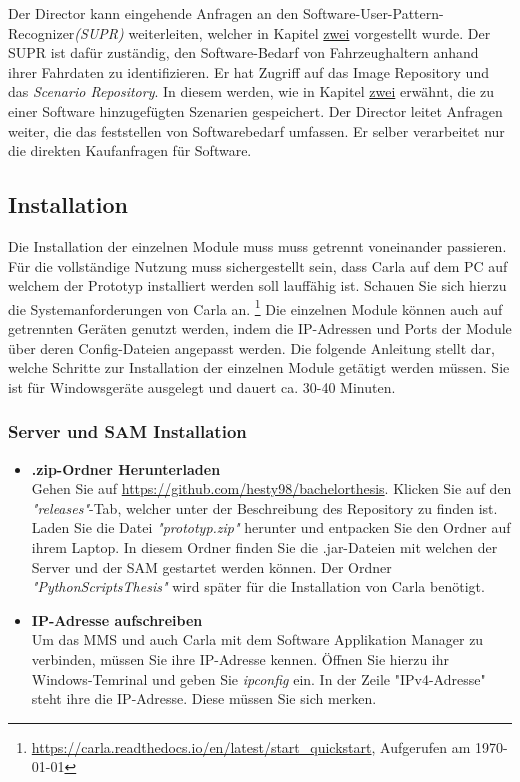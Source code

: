 Der Director kann eingehende Anfragen an den Software-User-Pattern-Recognizer\textit{(SUPR)} weiterleiten, welcher in Kapitel \hyperref[fs]{zwei} vorgestellt wurde. Der SUPR ist dafür zuständig, den Software-Bedarf von Fahrzeughaltern anhand ihrer Fahrdaten zu identifizieren. Er hat Zugriff auf das Image Repository und das \textit{Scenario Repository}. In diesem werden, wie in Kapitel \hyperref[konzept]{zwei} erwähnt, die zu einer Software hinzugefügten Szenarien gespeichert. Der Director leitet Anfragen weiter, die das feststellen von Softwarebedarf umfassen. Er selber verarbeitet nur die direkten Kaufanfragen für Software.

\subsection{Installation}
Die Installation der einzelnen Module muss muss getrennt voneinander passieren. Für die vollständige Nutzung muss sichergestellt sein, dass Carla auf dem PC auf welchem der Prototyp installiert werden soll lauffähig ist. Schauen Sie sich hierzu die Systemanforderungen von Carla an.  \footnote{\url{https://carla.readthedocs.io/en/latest/start_quickstart}, Aufgerufen am \today} Die einzelnen Module können auch auf getrennten Geräten genutzt werden, indem die IP-Adressen und Ports der Module über deren Config-Dateien angepasst werden. Die folgende Anleitung stellt dar, welche Schritte zur Installation der einzelnen Module getätigt werden müssen. Sie ist für Windowsgeräte ausgelegt und dauert ca. 30-40 Minuten.


\subsubsection{Server und SAM Installation}
\begin{itemize}
	\item[\textbf{1.}] \textbf{.zip-Ordner Herunterladen}\\
	Gehen Sie auf \url{https://github.com/hesty98/bachelorthesis}. Klicken Sie auf den \textit{"releases"}-Tab, welcher unter der Beschreibung des Repository zu finden ist.
	Laden Sie die Datei \textit{"prototyp.zip"} herunter und entpacken Sie den Ordner auf ihrem Laptop. In diesem Ordner finden Sie die .jar-Dateien mit welchen der Server und der SAM gestartet werden können. Der Ordner \textit{"PythonScriptsThesis"} wird später für die Installation von Carla benötigt.
	
	\item[\textbf{2.}] \textbf{IP-Adresse aufschreiben}\\
	Um das MMS und auch Carla mit dem Software Applikation Manager zu verbinden, müssen Sie ihre IP-Adresse kennen. Öffnen Sie hierzu ihr Windows-Temrinal und geben Sie \textit{ipconfig} ein. In der Zeile "IPv4-Adresse" steht ihre die IP-Adresse. Diese müssen Sie sich merken.
\end{itemize}


